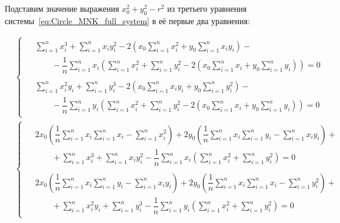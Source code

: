 Подставим значение выражения $x_0^2 + y_0^2 - r^2$ из третьего уравнения системы~\ref{eq:Circle_MNK_full_system} в её первые два уравнения:

\begin{align}
    \nonumber
    &\begin{cases}
         \begin{aligned}
             &\sum_{i=1}^{n} x_i^3 + \sum_{i=1}^{n} x_i y_i^2 - 2 \left(
             x_0 \sum_{i=1}^{n} x_i^2 + y_0 \sum_{i=1}^{n} x_i y_i \right) - \\
             &\qquad - \dfrac{1}{n} \sum_{i=1}^{n} x_i \left(
             \sum_{i=1}^{n} x_i^2 + \sum_{i=1}^{n} y_i^2
             - 2 \left( x_0 \sum_{i=1}^{n} x_i + y_0 \sum_{i=1}^{n} y_i \right)\right) = 0 \\
             \\
             &\sum_{i=1}^{n} x_i^2 y_i + \sum_{i=1}^{n} y_i^3 - 2 \left(
             x_0 \sum_{i=1}^{n} x_i y_i + y_0 \sum_{i=1}^{n} y_i^2 \right) - \\
             &\qquad - \dfrac{1}{n} \sum_{i=1}^{n} y_i \left(
             \sum_{i=1}^{n} x_i^2 + \sum_{i=1}^{n} y_i^2
             - 2 \left( x_0 \sum_{i=1}^{n} x_i + y_0 \sum_{i=1}^{n} y_i \right)\right) = 0
         \end{aligned}
    \end{cases} \\ \nonumber
    &\begin{cases}
         \begin{aligned}
             &2 x_0 \left( \dfrac{1}{n} \sum_{i=1}^{n} x_i \sum_{i=1}^{n} x_i - \sum_{i=1}^{n} x_i^2 \right)
             + 2 y_0 \left( \dfrac{1}{n} \sum_{i=1}^{n} x_i \sum_{i=1}^{n} y_i
             - \sum_{i=1}^{n} x_i y_i \right) + \\
             &\qquad + \sum_{i=1}^{n} x_i^3 + \sum_{i=1}^{n} x_i y_i^2
             - \dfrac{1}{n} \sum_{i=1}^{n} x_i
             \left( \sum_{i=1}^{n} x_i^2 + \sum_{i=1}^{n} y_i^2 \right) = 0 \\
             \\
             &2 x_0 \left( \dfrac{1}{n} \sum_{i=1}^{n} x_i \sum_{i=1}^{n} y_i
             - \sum_{i=1}^{n} x_i y_i \right)
             + 2 y_0 \left( \dfrac{1}{n} \sum_{i=1}^{n} x_i \sum_{i=1}^{n} x_i - \sum_{i=1}^{n} y_i^2 \right) + \\
             &\qquad + \sum_{i=1}^{n} x_i^2 y_i + \sum_{i=1}^{n} y_i^3
             - \dfrac{1}{n} \sum_{i=1}^{n} y_i
             \left(\sum_{i=1}^{n} x_i^2 + \sum_{i=1}^{n} y_i^2 \right) = 0

\end{aligned}
\end{cases}
\end{align}
